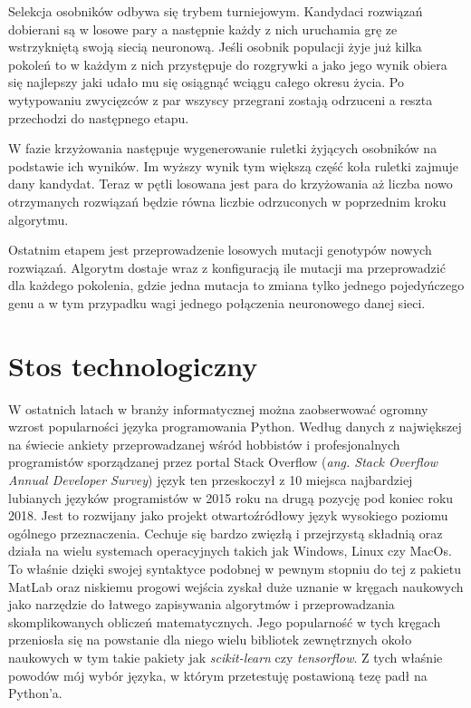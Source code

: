 \documentclass[12pt, oneside, a4paper]{report}
\begin{document}
Selekcja osobników odbywa się trybem turniejowym. Kandydaci rozwiązań dobierani są w losowe pary a następnie każdy z nich uruchamia grę ze wstrzykniętą swoją siecią neuronową. Jeśli osobnik populacji żyje już kilka pokoleń to w każdym z nich przystępuje do rozgrywki a jako jego wynik obiera się najlepszy jaki udało mu się osiągnąć wciągu całego okresu życia. Po wytypowaniu zwycięzców z par wszyscy przegrani zostają odrzuceni a reszta przechodzi do następnego etapu.

W fazie krzyżowania następuje wygenerowanie ruletki żyjących osobników na podstawie ich wyników. Im wyższy wynik tym większą część koła ruletki zajmuje dany kandydat. Teraz w pętli losowana jest para do krzyżowania aż liczba nowo otrzymanych rozwiązań będzie równa liczbie odrzuconych w poprzednim kroku algorytmu.

Ostatnim etapem jest przeprowadzenie losowych mutacji genotypów nowych rozwiązań. Algorytm dostaje wraz z konfiguracją ile mutacji ma przeprowadzić dla każdego pokolenia, gdzie jedna mutacja to zmiana tylko jednego pojedyńczego genu a w tym przypadku wagi jednego połączenia neuronowego danej sieci.

\section{Stos technologiczny}

W ostatnich latach w branży informatycznej można zaobserwować ogromny wzrost popularności języka programowania Python. Według danych z największej na świecie ankiety przeprowadzanej wśród hobbistów i profesjonalnych programistów sporządzanej przez portal Stack Overflow (\textit{ang. Stack Overflow Annual Developer Survey}) \citep{stackoverflow-survey} język ten przeskoczył z 10 miejsca najbardziej lubianych języków programistów w 2015 roku na drugą pozycję pod koniec roku 2018. Jest to rozwijany jako projekt otwartoźródłowy język wysokiego poziomu ogólnego przeznaczenia. Cechuje się bardzo zwięzłą i przejrzystą składnią oraz działa na wielu systemach operacyjnych takich jak Windows, Linux czy MacOs. To właśnie dzięki swojej syntaktyce podobnej w pewnym stopniu do tej z pakietu MatLab oraz niskiemu progowi wejścia zyskał duże uznanie w kręgach naukowych jako narzędzie do łatwego zapisywania algorytmów i przeprowadzania skomplikowanych obliczeń matematycznych. Jego popularność w tych kręgach przeniosła się na powstanie dla niego wielu bibliotek zewnętrznych około naukowych w tym takie pakiety jak \textit{scikit-learn} czy \textit{tensorflow}. Z tych właśnie powodów mój wybór języka, w którym przetestuję postawioną tezę padł na Python'a.
\end{document}

